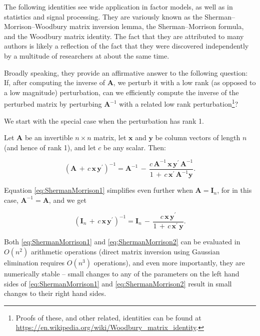 \documentclass[graybox,envcountchap,sectrefs]{svmono}\usepackage[]{graphicx}\usepackage[]{xcolor}
\begin{document}
\begin{appendices}
The following identities see wide application in factor models, as
well as in statistics and signal processing. They are variously known
as the Sherman--Morrison--Woodbury matrix inversion lemma, the Sherman--Morrison
formula, and the Woodbury matrix identity. The fact that they are
attributed to many authors is likely a reflection of the fact that
they were discovered independently by a multitude of researchers at
about the same time. 

Broadly speaking, they provide an affirmative answer to the following
question: If, after computing the inverse of $\mathrm{\mathbf{A}}$,
we perturb it with a low rank (as opposed to a low magnitude) perturbation,
can we efficiently compute the inverse of the perturbed matrix by
perturbing $\mathrm{\mathbf{A}}^{-1}$ with a related low rank perturbation\footnote{Proofs of these, and other related, identities can be found at \url{https://en.wikipedia.org/wiki/Woodbury_matrix_identity}.}? 

We start with the special case when the perturbation has rank 1. 

Let $\mathbf{A}$ be an invertible $n\times n$ matrix, let $\mathbf{x}$
and $\mathbf{y}$ be column vectors of length $n$ (and hence of rank
1), and let $c$ be any scalar. Then:

\begin{equation}
\left(\mathbf{A}\,+\,c\,\mathbf{x}\,\mathbf{y}^{\prime}\right)^{-1}=\mathbf{A}^{-1}\,-\,\frac{c\,\mathbf{A}^{-1}\,\mathbf{x}\,\mathbf{y}^{\prime}\,\mathbf{A}^{-1}}{1\,+\,c\,\mathbf{x}^{\prime}\,\mathbf{A}^{-1}\mathbf{y}}.\label{eq:ShermanMorrison1}
\end{equation}

Equation \eqref{eq:ShermanMorrison1} simplifies even further when
$\mathrm{\mathbf{A}}=\mathrm{\mathbf{I}}_{n}$, for in this case,
$\mathbf{A}^{-1}=\mathbf{A}$, and we get

\begin{equation}
\left(\mathbf{I}_{n}\,+\,c\,\mathbf{x}\,\mathbf{y}^{\prime}\right)^{-1}=\mathbf{I}_{n}\,-\,\frac{c\mathbf{\,x}\,\mathbf{y}^{\prime}}{1\,+\,c\,\mathbf{x}^{\prime}\,\mathbf{y}}.\label{eq:ShermanMorrison2}
\end{equation}

Both \eqref{eq:ShermanMorrison1} and \eqref{eq:ShermanMorrison2}
can be evaluated in $O\left(n^{2}\right)$ arithmetic operations (direct
matrix inversion using Gaussian elimination requires $O\left(n^{3}\right)$
operations), and even more importantly, they are numerically stable
-- small changes to any of the parameters on the left hand sides
of \eqref{eq:ShermanMorrison1} and \eqref{eq:ShermanMorrison2} result
in small changes to their right hand sides. 


\end{appendices}
\end{document}
